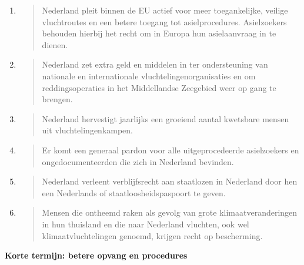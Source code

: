\begin{enumerate}
\def\labelenumi{\arabic{enumi}.}
\item
  \begin{quote}
  Nederland pleit binnen de EU actief voor meer toegankelijke, veilige
  vluchtroutes en een betere toegang tot asielprocedures. Asielzoekers
  behouden hierbij het recht om in Europa hun asielaanvraag in te
  dienen.
  \end{quote}
\item
  \begin{quote}
  Nederland zet extra geld en middelen in ter ondersteuning van
  nationale en internationale vluchtelingenorganisaties en om
  reddingsoperaties in het Middellandse Zeegebied weer op gang te
  brengen.
  \end{quote}
\item
  \begin{quote}
  Nederland hervestigt jaarlijks een groeiend aantal kwetsbare mensen
  uit vluchtelingenkampen.
  \end{quote}
\item
  \begin{quote}
  Er komt een generaal pardon voor alle uitgeprocedeerde asielzoekers en
  ongedocumenteerden die zich in Nederland bevinden.
  \end{quote}
\item
  \begin{quote}
  Nederland verleent verblijfsrecht aan staatlozen in Nederland door hen
  een Nederlands of staatloosheidspaspoort te geven.
  \end{quote}
\item
  \begin{quote}
  Mensen die ontheemd raken als gevolg van grote klimaatveranderingen in
  hun thuisland en die naar Nederland vluchten, ook wel
  klimaatvluchtelingen genoemd, krijgen recht op bescherming.
  \end{quote}
\end{enumerate}

\textbf{Korte termijn: betere opvang en procedures}

